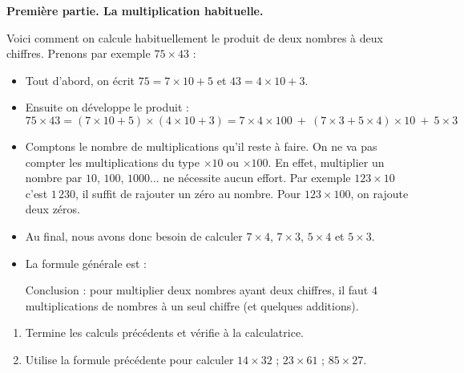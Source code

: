 \documentclass[class=report,crop=false, 12pt]{standalone}
\begin{document}
\begin{activite}

\textbf{Première partie. La multiplication habituelle.}

Voici comment on calcule habituellement le produit de deux nombres à deux chiffres. Prenons par exemple $75 \times 43$ :
\begin{itemize}
  \item Tout d'abord, on écrit $75 = 7 \times 10 + 5$ et $43 = 4 \times 10 + 3$.
  
  \item Ensuite on développe le produit :
  $$75 \times 43 
  = (7 \times 10 + 5) \times (4 \times 10 + 3)
  = 7 \times 4 \times 100 \  + \  (7 \times 3 + 5 \times 4)\times 10 \ + \ 5 \times 3$$

  \item Comptons le nombre de multiplications qu'il reste à faire.
  On ne va pas compter les multiplications du type $\times 10$ ou $\times 100$.
  En effet, multiplier un nombre par $10$, $100$, $1000$...  ne nécessite aucun effort.
  Par exemple $123\times 10$ c'est $1\,230$, il suffit de rajouter un zéro au nombre.
  Pour $123 \times 100$, on rajoute deux zéros.
  
  \item Au final, nous avons donc besoin de calculer $7 \times 4$, $7 \times 3$, $5 \times 4$ et $5 \times 3$. 
  
  \item La formule générale est :
  
  Conclusion : pour multiplier deux nombres ayant deux chiffres, il faut $4$ multiplications de nombres à un seul chiffre (et quelques additions).
\end{itemize}

\begin{enumerate} 
  \item Termine les calculs précédents et vérifie à la calculatrice.
  
  \item Utilise la formule précédente pour calculer $14 \times 32$ ; $23 \times 61$ ; $85 \times 27$.
  

\end{enumerate}
\end{activite}
\end{document}

